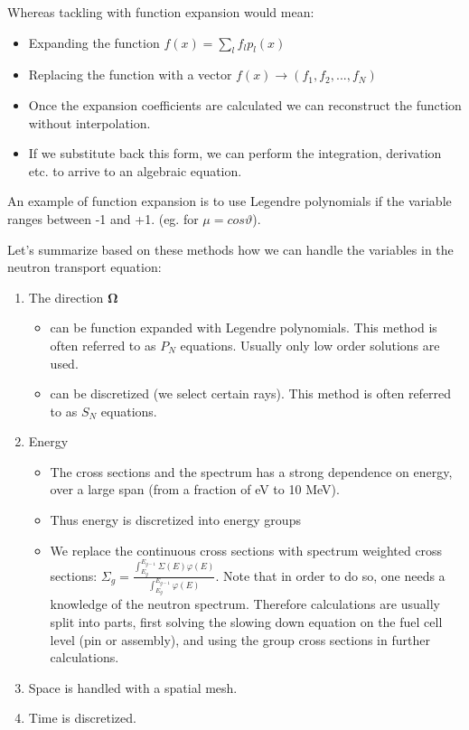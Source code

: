 \noindent Whereas tackling with function expansion would mean:

\begin{itemize}
\item Expanding the function $f(x)=\sum_lf_lp_l(x)$
\item Replacing the function with a vector $f(x)\rightarrow (f_1,f_2,...,f_N)$
\item Once the expansion coefficients are calculated we can reconstruct the function without interpolation.
\item If we substitute back this form, we can perform the integration, derivation etc. to arrive to an algebraic equation.
\end{itemize}

An example of function expansion is to use Legendre polynomials if the variable ranges between -1 and +1. (eg. for $\mu=cos\vartheta$).

Let's summarize based on these methods how we can handle the variables in the neutron transport equation:

\begin{enumerate}
\item The direction $\mathbf{\Omega}$
\begin{itemize}
\item can be function expanded with Legendre polynomials. This method is often referred to as $P_N$ equations. Usually only low order solutions are used.
\item can be discretized (we select certain rays). This method is often referred to as $S_N$ equations.
\end{itemize}
\item Energy
\begin{itemize}
\item The cross sections and the spectrum has a strong dependence on energy, over a large span (from a fraction of eV to 10 MeV).
\item Thus energy is discretized into energy groups
\item We replace the continuous cross sections with spectrum weighted cross sections: $\Sigma_g=\frac{\int_{E_g}^{E_{g-1}}\Sigma(E)\varphi(E)}{\int_{E_g}^{E_{g-1}}\varphi(E)}$. Note that in order to do so, one needs a knowledge of the neutron spectrum. Therefore calculations are usually split into parts, first solving the slowing down equation on the fuel cell level (pin or assembly), and using the group cross sections in further calculations.
\end{itemize}
\item Space is handled with a spatial mesh.
\item Time is discretized.
\end{enumerate}

